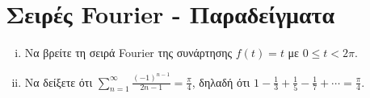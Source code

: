 




\pagestyle{vangelis}





\chapter*{Σειρές Fourier - Παραδείγματα}


\begin{mybox3}
\begin{example}
\item{}
\item{}
  \begin{enumerate}[i)]
    \item Να βρείτε τη σειρά Fourier της συνάρτησης $ f(t)=t $ με $ 0 \leq t < 2 \pi $.
    \item Να δείξετε ότι $ \sum_{n=1}^{\infty} \frac{(-1)^{n-1}}{2n-1} = 
      \frac{\pi}{4} $, δηλαδή ότι $ 1 - \frac{1}{3} + \frac{1}{5} - \frac{1}{7}
      + \cdots = \frac{\pi}{4} $.
  \end{enumerate}
\end{example}
\end{mybox3}
